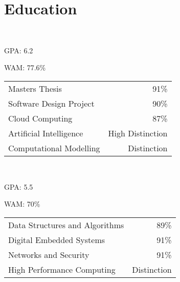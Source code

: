 \documentclass[a4paper]{style}
\begin{document}
\begin{minipage}[t]{0.45\textwidth} %

\section{Education} 
 \\
\vspace{\topsep} %
\vspace{1pt}
\begin{tightitemize}
    \item GPA\@: 6.2
    \item WAM\@: 77.6\%
\end{tightitemize}
\begin{tabular}{l|r}
    Masters Thesis & 91\% \\
	Software Design Project & 90\% \\
    Cloud Computing & 87\% \\
    Artificial Intelligence & High Distinction \\
	Computational Modelling & Distinction \\
\end{tabular}

\vspace{\topsep}

\\
\begin{tightitemize}
    \item GPA\@: 5.5
    \item WAM\@: 70\%
\end{tightitemize}
\begin{tabular}{l|r}
    Data Structures and Algorithms & 89\% \\
	Digital Embedded Systems & 91\% \\
    Networks and Security & 91\% \\
    High Performance Computing & Distinction \\
\end{tabular}



\end{minipage}
\end{document}
